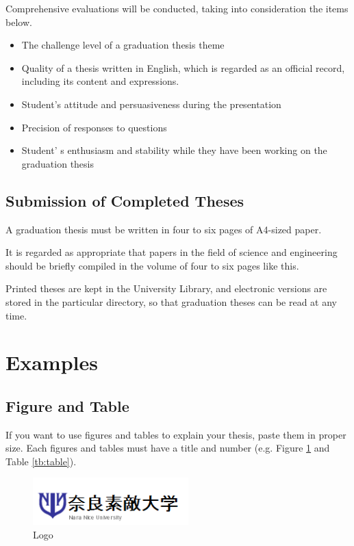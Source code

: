 \documentclass[ams]{U-AizuGT}
\begin{document}
			Comprehensive evaluations will be conducted, taking into consideration the items below.
			
			\begin{itemize}
				\item The challenge level of a graduation thesis theme
				\item Quality of a thesis written in English, which is regarded as an official record, including its content and expressions. 
				\item Student's attitude and persuasiveness during the presentation
				\item Precision of responses to questions
				\item Student' s enthusiasm and stability while they have been working on the graduation thesis
			\end{itemize}
			
		\subsection{Submission of Completed Theses}
			A graduation thesis must be written in four to six pages of A4-sized paper. 
			
			It is regarded as appropriate that papers in the field of science and engineering should be briefly compiled in the volume of four to six pages like this.
			
			Printed theses are kept in the University Library, and electronic versions are stored in the particular directory, so that graduation theses can be read at any time.
			
	\section{Examples}
		\subsection{Figure and Table}
			If you want to use figures and tables to explain your thesis, paste them in proper size. Each figures and tables must have a title and number (e.g. Figure \ref{fig:logo} and Table \ref{tb:table}).
			
			\begin{figure}[htb]
				\centering
				\includegraphics[width=6cm]{img/Naranice.png}
				\caption{Logo}
				\label{fig:logo} %
			\end{figure}
			
\end{document}

